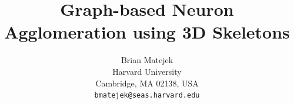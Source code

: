 \documentclass[10pt,twocolumn,letterpaper]{article}
\begin{document}
\title{Graph-based Neuron Agglomeration using 3D Skeletons}


\author{Brian Matejek\\
Harvard University\\
Cambridge, MA 02138, USA\\
{\tt\small bmatejek@seas.harvard.edu}
}

\maketitle
\end{document}
